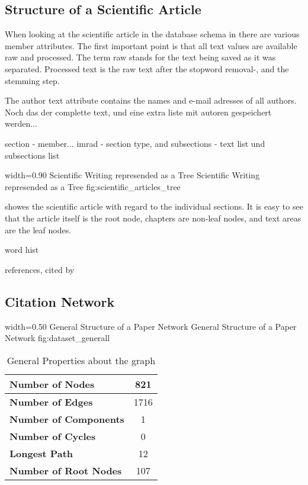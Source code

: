 \subsection{Structure of a Scientific Article}
\label{sec:structure_scientific_article}

When looking at the scientific article in the database schema in  there are various member attributes. The first important point is that all text values are available raw and processed. The term raw stands for the text being saved as it was separated. Processed text is the raw text after the stopword removal-, and the stemming step.

The author text attribute contains the names and e-mail adresses of all authors. Noch das der complette text, und eine extra liste mit autoren gespeichert werden...

section - member... imrad - section type, and subsections - text list und subsections list

      {width=0.90\textwidth}
      {Scientific Writing represended as a Tree}
      {Scientific Writing represended as a Tree}
      {fig:scientific_articles_tree}

 showes the scientific article with regard to the individual sections. It is easy to see that the article itself is the root node, chapters are non-leaf nodes, and text areas are the leaf nodes.

word hist

references, cited by

\subsection{Citation Network}
\label{sec:citation_network}

      {width=0.50\textwidth}
      {General Structure of a Paper Network}
      {General Structure of a Paper Network}
      {fig:dataset_generall}

\begin{table}
  \centering
  \begin{tabular}{ l c }
    \toprule
    \textbf{Number of Nodes} & 821 \\ \midrule
    \textbf{Number of Edges} & 1716 \\ \midrule
    \textbf{Number of Components} & 1 \\ \midrule
    \textbf{Number of Cycles} & 0 \\ \midrule
    \textbf{Longest Path} & 12 \\ \midrule
    \textbf{Number of Root Nodes} & 107 \\
    \bottomrule
  \end{tabular}
  \caption[General Properties about the graph in the used dataset]{General Properties about the graph}
  \label{tbl:general_properties_about_the_graph}
\end{table}


